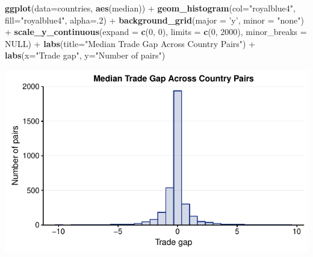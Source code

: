\documentclass[10pt,]{article}
\newenvironment{Shaded}{\begin{snugshade}}{\end{snugshade}}
\newcommand{\KeywordTok}[1]{\textcolor[rgb]{0.13,0.29,0.53}{\textbf{{#1}}}}
\newcommand{\DataTypeTok}[1]{\textcolor[rgb]{0.13,0.29,0.53}{{#1}}}
\newcommand{\DecValTok}[1]{\textcolor[rgb]{0.00,0.00,0.81}{{#1}}}
\newcommand{\StringTok}[1]{\textcolor[rgb]{0.31,0.60,0.02}{{#1}}}
\newcommand{\OtherTok}[1]{\textcolor[rgb]{0.56,0.35,0.01}{{#1}}}
\newcommand{\NormalTok}[1]{{#1}}
\begin{document}
\begin{Shaded}
\begin{Highlighting}[]
\KeywordTok{ggplot}\NormalTok{(}\DataTypeTok{data=}\NormalTok{countries, }\KeywordTok{aes}\NormalTok{(median)) +}
\StringTok{  }\KeywordTok{geom_histogram}\NormalTok{(}\DataTypeTok{col=}\StringTok{"royalblue4"}\NormalTok{,}
                 \DataTypeTok{fill=}\StringTok{"royalblue4"}\NormalTok{,}
                 \DataTypeTok{alpha=}\NormalTok{.}\DecValTok{2}\NormalTok{) +}
\StringTok{  }\KeywordTok{background_grid}\NormalTok{(}\DataTypeTok{major =} \StringTok{'y'}\NormalTok{, }\DataTypeTok{minor =} \StringTok{"none"}\NormalTok{) +}
\StringTok{  }\KeywordTok{scale_y_continuous}\NormalTok{(}\DataTypeTok{expand =} \KeywordTok{c}\NormalTok{(}\DecValTok{0}\NormalTok{, }\DecValTok{0}\NormalTok{), }\DataTypeTok{limits =} \KeywordTok{c}\NormalTok{(}\DecValTok{0}\NormalTok{, }\DecValTok{2000}\NormalTok{),  }\DataTypeTok{minor_breaks =} \OtherTok{NULL}\NormalTok{) +}
\StringTok{  }\KeywordTok{labs}\NormalTok{(}\DataTypeTok{title=}\StringTok{"Median Trade Gap Across Country Pairs"}\NormalTok{) +}
\StringTok{  }\KeywordTok{labs}\NormalTok{(}\DataTypeTok{x=}\StringTok{"Trade gap"}\NormalTok{, }\DataTypeTok{y=}\StringTok{"Number of pairs"}\NormalTok{)}
\end{Highlighting}
\end{Shaded}

\begin{center}\includegraphics{Figs/value_pairs-2} \end{center}
\end{document}
